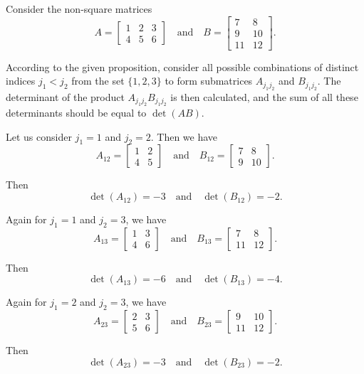 \begin{example}

Consider the non-square matrices
\[
A = \begin{bmatrix} 1 & 2 & 3 \\ 4 & 5 & 6 \end{bmatrix} \quad\text{and}\quad
B = \begin{bmatrix} 7 & 8 \\ 9 & 10 \\ 11 & 12 \end{bmatrix}.
\]

According to the given proposition, consider all possible combinations of distinct indices $j_1 < j_2$ from the set $\{1, 2, 3\}$ to form submatrices $A_{j_1j_2}$ and $B_{j_1j_2}$. The determinant of the product $A_{j_1j_2}B_{j_1j_2}$ is then calculated, and the sum of all these determinants should be equal to $\det(AB)$.

Let us consider $j_1 = 1$ and $j_2 = 2$. Then we have
\[
A_{12} = \begin{bmatrix} 1 & 2 \\ 4 & 5 \end{bmatrix} \quad\text{and}\quad B_{12} = \begin{bmatrix} 7 &  8 \\ 9 & 10 \end{bmatrix}.
\]

Then
\[
\det(A_{12}) = -3 \quad\text{and}\quad \det(B_{12}) = -2.
\]

Again for $j_1=1$ and $j_2=3$, we have
\[ A_{13} = \begin{bmatrix} 1 & 3 \\ 4 & 6 \end{bmatrix} \quad\text{and}\quad B_{13} = \begin{bmatrix} 7  & 8 \\ 11 & 12 \end{bmatrix}. \]

Then
\[ \det(A_{13}) = -6 \quad\text{and}\quad \det(B_{13}) = -4. \]


Again for \(j_1 = 2\) and \(j_2 = 3\), we have
\[ A_{23} = \begin{bmatrix} 2 & 3 \\ 5 & 6 \end{bmatrix} \quad\text{and}\quad B_{23} = \begin{bmatrix} 9 & 10 \\ 11 & 12 \end{bmatrix}. \]

Then
\[ \det(A_{23}) = -3 \quad\text{and}\quad \det(B_{23}) = -2. \]


\end{example}

